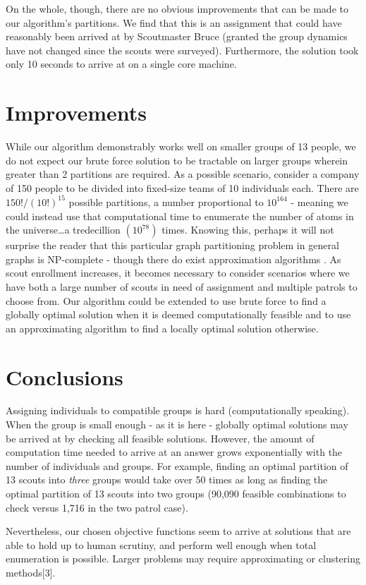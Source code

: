 \documentclass{amsart}
\theoremstyle{definition}
\theoremstyle{remark}
\numberwithin{equation}{section}
\begin{document}
On the whole, though, there are no obvious improvements that can be made to our algorithm's partitions. We find that this is an assignment that could have reasonably been arrived at by Scoutmaster Bruce (granted the group dynamics have not changed since the scouts were surveyed).  Furthermore, the solution took only 10 seconds to arrive at on a single core machine.

\section*{Improvements}
While our algorithm demonstrably works well on smaller groups of 13 people, we do not expect our brute force solution to be tractable on larger groups wherein greater than 2 partitions are required. As a possible scenario, consider a company of 150 people to be divided into fixed-size teams of 10 individuals each. There are $150! / (10!)^{15}$ possible partitions, a number proportional to $10^{164}$ - meaning we could instead use that computational time to enumerate the number of atoms in the universe\ldots a tredecillion $(10^{78})$ times. Knowing this, perhaps it will not surprise the reader that this particular graph partitioning problem in general graphs is NP-complete - though there do exist approximation algorithms \cite{A}.
As scout enrollment increases, it becomes necessary to consider scenarios where we have both a large number of scouts in need of assignment and multiple patrols to choose from. Our algorithm could be extended to use brute force to find a globally optimal solution when it is deemed computationally feasible and to use an approximating algorithm to find a locally optimal solution otherwise. 

\section*{Conclusions}
Assigning individuals to compatible groups is hard (computationally speaking). When the group is small enough - as it is here - globally optimal solutions may be arrived at by checking all feasible solutions. However, the amount of computation time needed to arrive at an answer grows exponentially with the number of individuals and groups. For example, finding an optimal partition of 13 scouts into \textit{three} groups would take over 50 times as long as finding the optimal partition of 13 scouts into two groups (90,090 feasible combinations to check versus 1,716 in the two patrol case).


Nevertheless, our chosen objective functions seem to arrive at solutions that are able to hold up to human scrutiny, and perform well enough when total enumeration is possible. Larger problems may require approximating or clustering methods[3]. 
\end{document}
